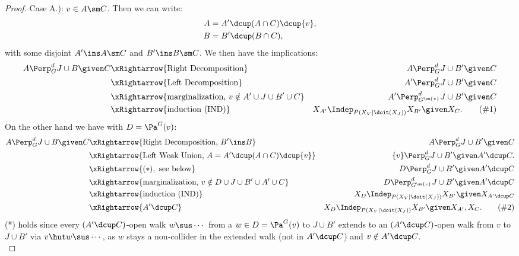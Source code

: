 \begin{Thm}
\begin{proof}
Case A.):  $v \in A\sm C$. Then we can write:
\begin{align*}
    A &= A' \dcup (A \cap C) \dcup \{v\}, \\
    B &= B' \dcup (B \cap C),
\end{align*}
with some disjoint $A' \ins A \sm C$ and $B' \ins B \sm C$.
We then have the implications:
\begin{align*}
    A \Perp^d_G J \cup B \given C & \xRightarrow{\text{Right Decomposition}}  & A \Perp^d_G J \cup B' \given C \\
    & \xRightarrow{\text{Left Decomposition}}  & A' \Perp^d_G J \cup B' \given C \\
    & \xRightarrow{\text{marginalization, } v \notin A'\cup J \cup B' \cup C}  & A' \Perp^d_{G^{\sm \{v\}}} J \cup B' \given C \\
 & \xRightarrow{\text{induction (IND)}}  & X_{A'} \Indep_{P(X_V|\doit(X_J))}  X_{B'} \given X_C. \label{eqn:bli} \tag{\#1}\\
\end{align*}
On the other hand we have with $D = \Pa^G(v)$:
\begin{align*}
 A \Perp^d_G J \cup B \given C & \xRightarrow{\text{Right Decomposition, }B' \ins B}  & A \Perp^d_G J \cup  B' \given C   \\
  & \xRightarrow{\text{Left Weak Union, } A= A' \dcup (A \cap C) \dcup \{v\}}  & \{v\} \Perp^d_G J \cup  B' \given A' \dcup C.    \\
 & \xRightarrow{(*), \text{ see below}}  & D  \Perp^d_G J \cup  B' \given A' \dcup C \\ 
 & \xRightarrow{\text{marginalization, } v \notin D \cup J \cup B' \cup A' \cup C}  & D \Perp^d_{G^{\sm \{v\}}} J \cup B' \given A' \dcup C \\
& \xRightarrow{\text{induction (IND)}}  &   X_D  \Indep_{P(X_V|\doit(X_J))}  X_{B'} \given X_{A' \dcup C}\\
& \xRightarrow{A'\dcup C}  &   X_D  \Indep_{P(X_V|\doit(X_J))}  X_{B'} \given X_{A'}, X_C. \label{eqn:bla} \tag{\#2}
\end{align*}
(*) holds since every $(A' \dcup C)$-open walk $ w \sus \cdots$ from a  $w \in D=\Pa^G(v)$ to $J \cup B'$ 
extends to an $(A' \dcup C)$-open walk from $v$ to $J \cup B'$ via  $v \hut w \sus \cdots$, as $w$ stays a 
non-collider in the extended walk (not in $A' \dcup C$) and $v \notin A' \dcup C$.\\


\end{proof}
\end{Thm}

